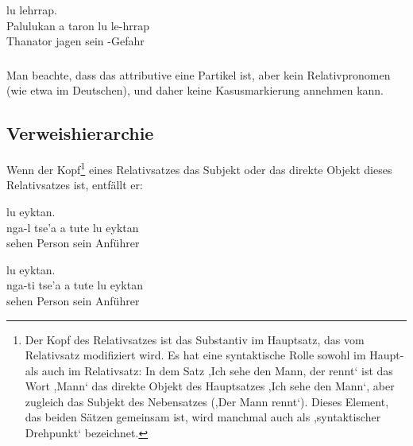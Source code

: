 \begin{interlin} \label{syn:rel:ex02}
	\glll \Npawl{}   lu lehrrap. \\
	Palulukan a taron lu le-hrrap \\
	Thanator  jagen sein -Gefahr \\
\end{interlin}

\subsubsection{} Man beachte, dass das attributive  eine Partikel ist, aber kein Relativpronomen (wie etwa im Deutschen), und daher keine Kasusmarkierung annehmen kann.

\subsection{Verweishierarchie} Wenn der Kopf\footnote{Der Kopf des Relativsatzes ist das Substantiv im Hauptsatz, das vom Relativsatz modifiziert wird. Es hat eine syntaktische Rolle sowohl im Haupt- als auch im Relativsatz: In dem Satz ,Ich sehe den Mann, der rennt‘ ist das Wort ,Mann‘ das direkte Objekt des Hauptsatzes ,Ich sehe den Mann‘, aber zugleich das Subjekt des Nebensatzes (,Der Mann rennt‘). Dieses Element, das beiden Sätzen gemeinsam ist, wird manchmal auch als ,syntaktischer Drehpunkt‘ bezeichnet.} eines Relativsatzes das Subjekt oder das direkte Objekt dieses Relativsatzes ist, entfällt er:

\begin{interlin} \label{syn:rel:ex03}
	\glll \Npawl{}    lu eyktan. \\
	nga-l tse'a a tute lu eyktan \\
	 sehen  Person sein Anführer \\
\end{interlin}

\begin{interlin} 
	\glll \Npawl{}    lu eyktan. \\
	nga-ti tse'a a tute lu eyktan \\
	 sehen  Person sein Anführer \\
	\end{interlin}

